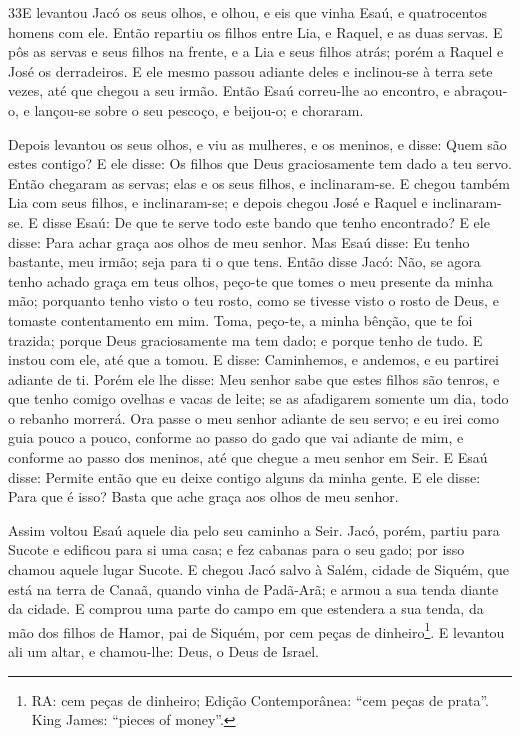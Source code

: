 \smallskip

\lettrine{33} E levantou Jacó os seus olhos, e olhou, e eis
que vinha Esaú, e quatrocentos homens com ele. Então repartiu os
filhos entre Lia, e Raquel, e as duas servas. E pôs as servas e
seus filhos na frente, e a Lia e seus filhos atrás; porém a Raquel e
José os derradeiros. E ele mesmo passou adiante deles e
inclinou-se à terra sete vezes, até que chegou a seu irmão.
Então Esaú correu-lhe ao encontro, e abraçou-o, e lançou-se
sobre o seu pescoço, e beijou-o; e choraram.

Depois levantou os seus olhos, e viu as mulheres, e os meninos, e
disse: Quem são estes contigo? E ele disse: Os filhos que Deus
graciosamente tem dado a teu servo. Então chegaram as servas;
elas e os seus filhos, e inclinaram-se. E chegou também Lia com
seus filhos, e inclinaram-se; e depois chegou José e Raquel e
inclinaram-se. E disse Esaú: De que te serve todo este bando que
tenho encontrado? E ele disse: Para achar graça aos olhos de meu
senhor. Mas Esaú disse: Eu tenho bastante, meu irmão; seja para
ti o que tens. Então disse Jacó: Não, se agora tenho achado
graça em teus olhos, peço-te que tomes o meu presente da minha mão;
porquanto tenho visto o teu rosto, como se tivesse visto o rosto de
Deus, e tomaste contentamento em mim. Toma, peço-te, a minha
bênção, que te foi trazida; porque Deus graciosamente ma tem dado; e
porque tenho de tudo. E instou com ele, até que a tomou. E
disse: Caminhemos, e andemos, e eu partirei adiante de ti.
Porém ele lhe disse: Meu senhor sabe que estes filhos são
tenros, e que tenho comigo ovelhas e vacas de leite; se as
afadigarem somente um dia, todo o rebanho morrerá. Ora passe
o meu senhor adiante de seu servo; e eu irei como guia pouco a
pouco, conforme ao passo do gado que vai adiante de mim, e conforme
ao passo dos meninos, até que chegue a meu senhor em Seir. E
Esaú disse: Permite então que eu deixe contigo alguns da minha
gente. E ele disse: Para que é isso? Basta que ache graça aos olhos
de meu senhor.

Assim voltou Esaú aquele dia pelo seu caminho a Seir.
Jacó, porém, partiu para Sucote e edificou para si uma casa;
e fez cabanas para o seu gado; por isso chamou aquele lugar Sucote.
E chegou Jacó salvo à Salém, cidade de Siquém, que está na
terra de Canaã, quando vinha de Padã-Arã; e armou a sua tenda diante
da cidade. E comprou uma parte do campo em que estendera a
sua tenda, da mão dos filhos de Hamor, pai de Siquém, por cem peças
de dinheiro\footnote{RA: cem peças de dinheiro; Edição
Contemporânea: ``cem peças de prata''. King James: ``pieces of
money''.}. E levantou ali um altar, e chamou-lhe: Deus, o
Deus de Israel.


